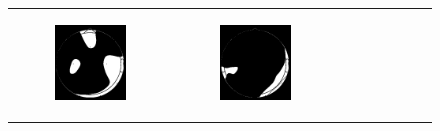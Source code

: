 \begin{figure}[!ht]
    \begin{tabular}{ccc}
        \begin{subfigure}[c]{0.3\textwidth}
            \centering
            \includegraphics{images/topomap_alpha_binary.png}
            \caption{}
        \end{subfigure}
        &
        \begin{subfigure}[c]{0.3\textwidth}
            \centering
            \includegraphics{images/topomap_beta_binary.png}
            \caption{}
        \end{subfigure}
        &
        \begin{subfigure}[c]{0.3\textwidth}
            \centering

\end{subfigure}
\end{tabular}
\end{figure}
